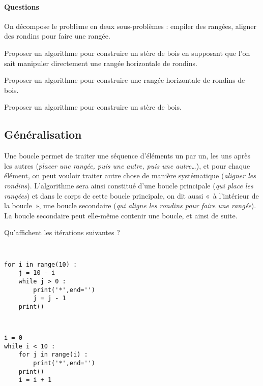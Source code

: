 \paragraph{Questions} 
On décompose le problème en deux sous-problèmes : empiler des rangées, aligner des rondins pour faire une rangée.

\begin{question} Proposer un algorithme pour 
construire un stère de bois en supposant que l'on sait manipuler directement
une rangée horizontale de rondins.
\end{question}

\begin{question} Proposer un algorithme
pour construire une rangée horizontale de rondins de bois.
\end{question}

\begin{question} Proposer un algorithme
pour construire un stère de \linebreak bois.
\end{question}


\subsection{Généralisation}
Une boucle permet de traiter une séquence d'éléments un par un, 
les uns après les autres (\emph{placer une rangée, puis une autre, puis une autre\ldots}), et pour chaque élément, 
on peut vouloir traiter autre chose de manière systématique (\emph{aligner les rondins}).
L'algorithme sera ainsi constitué d'une boucle principale (\emph{qui place les rangées}) et
dans le corps de cette boucle principale, on dit aussi «~à l'intérieur de la boucle~», 
une boucle secondaire (\emph{qui aligne les rondins pour faire une rangée}).
La boucle secondaire peut elle-même contenir une boucle, et ainsi de suite.


\begin{question}
Qu'affichent les itérations suivantes ?

\begin{minipage}[t]{6cm}\tt
\begin{Verbatim}
for i in range(10) :
    j = 10 - i
    while j > 0 :
        print('*',end='')
        j = j - 1
    print()
\end{Verbatim}
\end{minipage}
\hfill
\begin{minipage}[t]{6cm}\tt
\begin{Verbatim}
i = 0
while i < 10 :
    for j in range(i) :
        print('*',end='')
    print()
    i = i + 1
\end{Verbatim}
\end{minipage}

\end{question}

